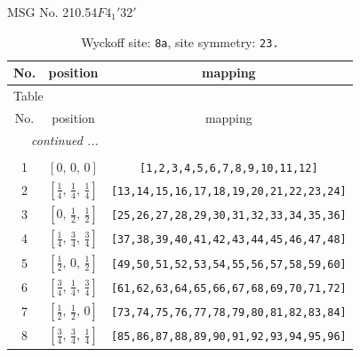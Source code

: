 \documentclass[fleqn,8pt]{jsarticle}
\begin{document}
\setcounter{MaxMatrixCols}{32}

\renewcommand{\tablename}{Table~}
\renewcommand{\figurename}{Figure~}
\begin{center}
\LARGE
MSG No. 210.54\quad$F4_{1}'32'$
\end{center}
\renewcommand{\arraystretch}{1.2}
\begin{longtable}{ccc}
\caption{Wyckoff site: {\tt 8a}, site symmetry: {\tt 23.}}
 \\
 \hline \hline
No. & position & mapping \\ \hline \endfirsthead

\multicolumn{2}{l}{\tablename\ \thetable{}} \\
 \hline \hline
No. & position & mapping \\ \hline \endhead

 \hline \hline
\multicolumn{2}{r}{\footnotesize\it continued ...} \\ \endfoot

 \hline \hline
\multicolumn{2}{r}{} \\ \endlastfoot

1 & $\left[ 0,\, 0,\, 0 \right]$ & {\tt [1,2,3,4,5,6,7,8,9,10,11,12]} \\ \hline
2 & $\left[ \frac{1}{4},\, \frac{1}{4},\, \frac{1}{4} \right]$ & {\tt [13,14,15,16,17,18,19,20,21,22,23,24]} \\ \hline
3 & $\left[ 0,\, \frac{1}{2},\, \frac{1}{2} \right]$ & {\tt [25,26,27,28,29,30,31,32,33,34,35,36]} \\ \hline
4 & $\left[ \frac{1}{4},\, \frac{3}{4},\, \frac{3}{4} \right]$ & {\tt [37,38,39,40,41,42,43,44,45,46,47,48]} \\ \hline
5 & $\left[ \frac{1}{2},\, 0,\, \frac{1}{2} \right]$ & {\tt [49,50,51,52,53,54,55,56,57,58,59,60]} \\ \hline
6 & $\left[ \frac{3}{4},\, \frac{1}{4},\, \frac{3}{4} \right]$ & {\tt [61,62,63,64,65,66,67,68,69,70,71,72]} \\ \hline
7 & $\left[ \frac{1}{2},\, \frac{1}{2},\, 0 \right]$ & {\tt [73,74,75,76,77,78,79,80,81,82,83,84]} \\ \hline
8 & $\left[ \frac{3}{4},\, \frac{3}{4},\, \frac{1}{4} \right]$ & {\tt [85,86,87,88,89,90,91,92,93,94,95,96]} \\
\end{longtable}
\renewcommand{\arraystretch}{1.2}
\end{document}
